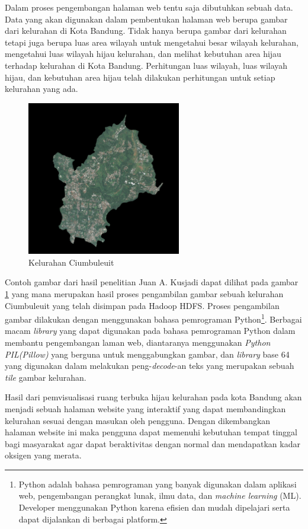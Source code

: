 Dalam proses pengembangan halaman web tentu saja dibutuhkan sebuah data. Data yang akan digunakan dalam pembentukan halaman web berupa gambar dari kelurahan di Kota Bandung. Tidak hanya berupa gambar dari kelurahan tetapi juga berupa luas area wilayah untuk mengetahui besar wilayah kelurahan, mengetahui luas wilayah hijau kelurahan, dan melihat kebutuhan area hijau terhadap kelurahan di Kota Bandung. Perhitungan luas wilayah, luas wilayah hijau, dan kebutuhan area hijau telah dilakukan perhitungan untuk setiap kelurahan yang ada. 

\begin{figure}[H]
	\centering
	\includegraphics[width=0.6\textwidth]{Gambar/Ciumbuleuit.png}
	\caption{Kelurahan Ciumbuleuit}
	\label{fig:ciumbuleuit}
\end{figure}

Contoh gambar dari hasil penelitian Juan A. Kusjadi dapat dilihat pada gambar \ref{fig:ciumbuleuit} yang mana merupakan hasil proses pengambilan gambar sebuah kelurahan Ciumbuleuit yang telah disimpan pada Hadoop HDFS. Proses pengambilan gambar dilakukan dengan menggunakan bahasa pemrograman Python\footnote{Python adalah bahasa pemrograman yang banyak digunakan dalam aplikasi web, pengembangan perangkat lunak, ilmu data, dan \textit{machine learning} (ML). Developer menggunakan Python karena efisien dan mudah dipelajari serta dapat dijalankan di berbagai platform.}. Berbagai macam \textit{library} yang dapat digunakan pada bahasa pemrograman Python dalam membantu pengembangan laman web, diantaranya menggunakan \textit{Python PIL(Pillow)} yang berguna untuk menggabungkan gambar, dan \textit{library} base 64 yang digunakan dalam melakukan peng-\textit{decode}-an teks yang merupakan sebuah \textit{tile} gambar kelurahan.

Hasil dari pemvisualisasi ruang terbuka hijau kelurahan pada kota Bandung akan menjadi sebuah halaman website yang interaktif yang dapat membandingkan kelurahan sesuai dengan masukan oleh pengguna. Dengan dikembangkan halaman website ini maka pengguna dapat memenuhi kebutuhan tempat tinggal bagi masyarakat agar dapat beraktivitas dengan normal dan mendapatkan kadar oksigen yang merata. 

